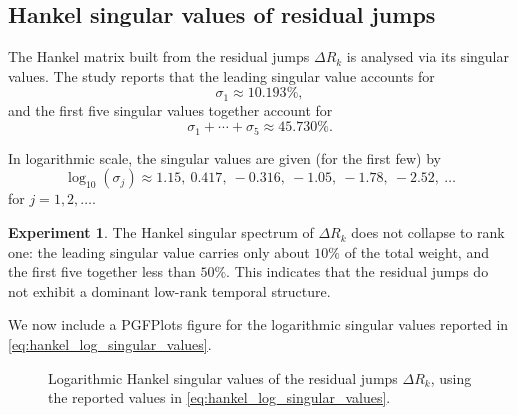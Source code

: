 \documentclass[11pt]{amsart}
\numberwithin{equation}{section}
\theoremstyle{plain}
\theoremstyle{definition}
\newtheorem{experiment}[theorem]{Experiment}
\theoremstyle{remark}
\begin{document}
\subsection{Hankel singular values of residual jumps}
\label{subsec:hankel_singular_values}

The Hankel matrix built from the residual jumps $\Delta R_k$
is analysed via its singular values.
The study reports that the leading singular value accounts for
\begin{equation}
\sigma_1 \approx 10.193\%,
\label{eq:hankel_sigma1_share}
\end{equation}
and the first five singular values together account for
\begin{equation}
\sigma_1 + \cdots + \sigma_5 \approx 45.730\%.
\label{eq:hankel_sigma1_5_share}
\end{equation}

In logarithmic scale, the singular values are given (for the first few)
by
\begin{equation}
\log_{10}(\sigma_j) \approx
1.15,\ 0.417,\ -0.316,\ -1.05,\ -1.78,\ -2.52,\ \dots
\label{eq:hankel_log_singular_values}
\end{equation}
for $j=1,2,\dots$.

\begin{experiment}
\label{exp:hankel_singular_values}
The Hankel singular spectrum of $\Delta R_k$
does not collapse to rank one:
the leading singular value carries only about $10\%$ of the total weight,
and the first five together less than $50\%$.
This indicates that the residual jumps do not exhibit
a dominant low-rank temporal structure.
\end{experiment}

We now include a PGFPlots figure for the logarithmic singular values
reported in \eqref{eq:hankel_log_singular_values}.

\begin{figure}[htbp]
\centering
{}
\caption{Logarithmic Hankel singular values of the residual jumps
$\Delta R_k$, using the reported values in
\eqref{eq:hankel_log_singular_values}.}
\label{fig:hankel_singular_values}
\end{figure}
\end{document}
